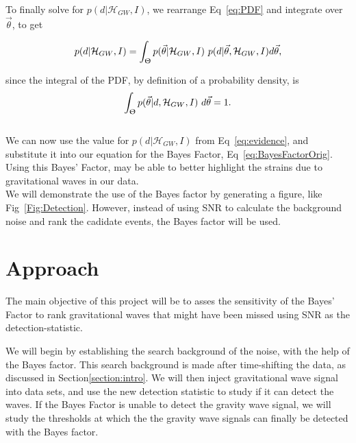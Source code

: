 \documentclass{article}
\begin{document}
To finally solve for $p(d|\mathcal{H}_{GW}, I)$, we rearrange Eq~\ref{eq:PDF} and integrate over $\vec{\theta}$, to get 

\begin{equation} \label{eq:evidence}
 p(d|\mathcal{H}_{GW}, I)    = \int_{\Uptheta} p(\vec{\theta}| \mathcal{H}_{GW}, I) \ p(d|\vec{\theta},  \mathcal{H}_{GW}, I) d\vec{\theta},
\end{equation}


since the integral of the PDF, by definition of a probability density, is $$\int_{\Uptheta} p(\vec{\theta}|d, \mathcal{H}_{GW}, I)\ d\vec{\theta}  = 1 .$$ \\

We can now use the value for $p(d|\mathcal{H}_{GW}, I)$ from  Eq~\ref{eq:evidence}, and substitute it into our equation for the Bayes Factor, Eq~\ref{eq:BayesFactorOrig}. Using this Bayes' Factor, may be able to better highlight the strains due to gravitational waves in our data.\\

We will demonstrate the use of the Bayes factor by generating a figure, like Fig~\ref{Fig:Detection}. However, instead of using SNR to calculate the background noise and rank the cadidate events, the Bayes factor will be used. %
 
 
 \section{Approach}
 The main objective of this project will be to asses the sensitivity of the Bayes' Factor to rank gravitational waves that might have been missed using SNR as the detection-statistic. 
 
 We will begin by establishing the search background of the noise, with the help of the Bayes factor. This search background is made after time-shifting the data, as discussed in Section\ref{section:intro}.  We will then inject gravitational wave signal into data sets, and use the new detection statistic to study if it can detect the waves. If the Bayes Factor is unable to detect the gravity wave signal, we will study the thresholds at which the the gravity wave signals can finally be detected with the Bayes factor. 
 
\end{document}
